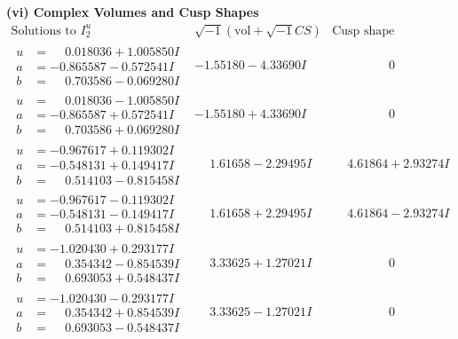 \documentclass[1p]{elsarticle_modified}
\theoremstyle{definition}
\newcommand{\I}{\sqrt{-1}}
\begin{document}
\newpage\flushleft \textbf{(vi) Complex Volumes and Cusp Shapes}
$$\begin{array}{c|c|c}  
\text{Solutions to }I^u_{2}& \I (\text{vol} + \sqrt{-1}CS) & \text{Cusp shape}\\
 \hline 
\begin{aligned}
u &= \phantom{-}0.018036 + 1.005850 I \\
a &= -0.865587 - 0.572541 I \\
b &= \phantom{-}0.703586 - 0.069280 I\end{aligned}
 & -1.55180 - 4.33690 I & \phantom{-0.000000 } 0 \\ \hline\begin{aligned}
u &= \phantom{-}0.018036 - 1.005850 I \\
a &= -0.865587 + 0.572541 I \\
b &= \phantom{-}0.703586 + 0.069280 I\end{aligned}
 & -1.55180 + 4.33690 I & \phantom{-0.000000 } 0 \\ \hline\begin{aligned}
u &= -0.967617 + 0.119302 I \\
a &= -0.548131 + 0.149417 I \\
b &= \phantom{-}0.514103 - 0.815458 I\end{aligned}
 & \phantom{-}1.61658 - 2.29495 I & \phantom{-}4.61864 + 2.93274 I \\ \hline\begin{aligned}
u &= -0.967617 - 0.119302 I \\
a &= -0.548131 - 0.149417 I \\
b &= \phantom{-}0.514103 + 0.815458 I\end{aligned}
 & \phantom{-}1.61658 + 2.29495 I & \phantom{-}4.61864 - 2.93274 I \\ \hline\begin{aligned}
u &= -1.020430 + 0.293177 I \\
a &= \phantom{-}0.354342 - 0.854539 I \\
b &= \phantom{-}0.693053 + 0.548437 I\end{aligned}
 & \phantom{-}3.33625 + 1.27021 I & \phantom{-0.000000 } 0 \\ \hline\begin{aligned}
u &= -1.020430 - 0.293177 I \\
a &= \phantom{-}0.354342 + 0.854539 I \\
b &= \phantom{-}0.693053 - 0.548437 I\end{aligned}
 & \phantom{-}3.33625 - 1.27021 I & \phantom{-0.000000 } 0 \\ \hline\begin{aligned}

\end{aligned}
\end{array}$$
\end{document}
